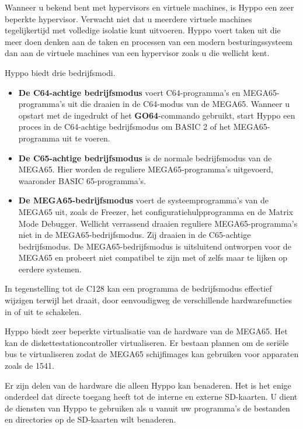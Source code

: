 Wanneer u bekend bent met hypervisors en virtuele machines, is Hyppo een zeer beperkte hypervisor. Verwacht niet dat u meerdere virtuele machines tegelijkertijd met volledige isolatie kunt uitvoeren. Hyppo voert taken uit die meer doen denken aan de taken en processen van een modern besturingssysteem dan aan de virtuele machines van een hypervisor zoals u die wellicht kent.

Hyppo biedt drie bedrijfsmodi.

\begin{itemize}
  
\item \textbf{De C64-achtige bedrijfsmodus} voert C64-programma's en MEGA65-programma's uit die draaien in de C64-modus van de MEGA65. Wanneer u opstart met de \megasymbolkey ingedrukt of het \textbf{GO64}-commando gebruikt, start Hyppo een proces in de C64-achtige bedrijfsmodus om BASIC 2 of het MEGA65-programma uit te voeren.  
\item \textbf{De C65-achtige bedrijfsmodus} is de normale bedrijfsmodus van de MEGA65. Hier worden de reguliere MEGA65-programma's uitgevoerd, waaronder BASIC 65-programma's.  
\item \textbf{De MEGA65-bedrijfsmodus} voert de systeemprogramma's van de MEGA65 uit, zoals de Freezer, het configuratiehulpprogramma en de Matrix Mode Debugger. Wellicht verrassend draaien reguliere MEGA65-programma's niet in de MEGA65-bedrijfsmodus. Zij draaien in de C65-achtige bedrijfsmodus. De MEGA65-bedrijfsmodus is uitsluitend ontworpen voor de MEGA65 en probeert niet compatibel te zijn met of zelfs maar te lijken op eerdere systemen.
\end{itemize}

In tegenstelling tot de C128 kan een programma de bedrijfsmodus effectief wijzigen terwijl het draait, door eenvoudigweg de verschillende hardwarefuncties in of uit te schakelen.

\filbreak
Hyppo biedt zeer beperkte virtualisatie van de hardware van de MEGA65. Het kan de diskettestationcontroller virtualiseren. Er bestaan plannen om de seriële bus te virtualiseren zodat de MEGA65 schijfimages kan gebruiken voor apparaten zoals de 1541.

Er zijn delen van de hardware die alleen Hyppo kan benaderen. Het is het enige onderdeel dat directe toegang heeft tot de interne en externe SD-kaarten. U dient de diensten van Hyppo te gebruiken als u vanuit uw programma's de bestanden en directories op de SD-kaarten wilt benaderen.

